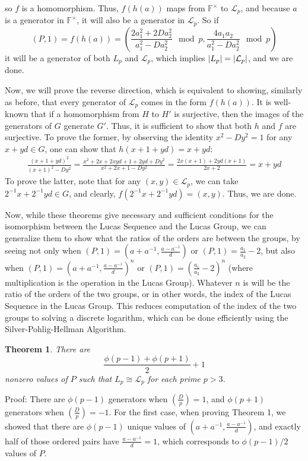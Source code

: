 \documentclass{article}
\DeclarePairedDelimiter{\abs}{\lvert}{\rvert}
\newcommand{\legendre}[2]{\genfrac{(}{)}{}{}{#1}{#2}}
\newtheorem{theorem}{Theorem}
\begin{document}
so $f$ is a homomorphism. Thus, $f(h(a))$ maps from $\mathbb{F}^\times$ to $\mathcal{L}_p$, and because $a$ is a generator in $\mathbb{F}^\times$, it will also be a generator in $\mathcal{L}_p$. So if $$(P,1) = f(h(a)) = \left ( \frac{2a_1^2 + 2Da_2^2}{a_1^2-Da_2^2} \mod p, \frac{4a_1a_2}{a_1^2-Da_2^2} \mod p \right )$$ it will be a generator of both $L_p$ and $\mathcal{L}_p$, which implies $\abs{L_p} = \abs{\mathcal{L}_p}$, and we are done.

Now, we will prove the reverse direction, which is equivalent to showing, similarly as before, that every generator of $\mathcal{L}_p$ comes in the form $f(h(a))$. It is well-known that if a homomorphism from $H$ to $H'$ is surjective, then the images of the generators of $G$ generate $G'$. Thus, it is sufficient to show that both $h$ and $f$ are surjective. To prove the former, by observing the identity $x^2-Dy^2 = 1$ for any $x+yd \in G$, one can show that $h(x+1+yd) = x+yd$:
\begin{gather*}
	\frac{(x+1+yd)^2}{(x+1)^2-Dy^2} = \frac{x^2 + 2x + 2xyd + 1 + 2yd + Dy^2}{x^2 + 2x + 1 - Dy^2} = \frac{2x(x+1) + 2yd(x+1)}{2x + 2} = x + yd
\end{gather*}
To prove the latter, note that for any $(x,y) \in \mathcal{L}_p$, we can take $2^{-1}x + 2^{-1}yd \in G$, and clearly, $f(2^{-1}x + 2^{-1}yd) = (x,y)$. Thus, we are done.

Now, while these theorems give necessary and sufficient conditions for the isomorphism between the Lucas Sequence and the Lucas Group, we can generalize them to show what the ratios of the orders are between the groups, by seeing not only when $(P,1) = (a+a^{-1}, \frac{a-a^{-1}}{d})$ or $(P,1) = \frac{a_1}{a_2} - 2$, but also when $(P,1) = (a+a^{-1}, \frac{a-a^{-1}}{d})^n$ or $(P,1) = (\frac{a_1}{a_2} - 2)^n$ (where multiplication is the operation in the Lucas Group). Whatever $n$ is will be the ratio of the orders of the two groups, or in other words, the index of the Lucas Sequence in the Lucas Group. This reduces computation of the index of the two groups to solving a discrete logarithm, which can be done efficiently using the Silver-Pohlig-Hellman Algorithm. 

\begin{theorem}
There are $$\frac{\phi(p-1) + \phi(p+1)}{2} + 1$$ nonzero values of $P$ such that $L_p \cong \mathcal{L}_p$ for each prime $p > 3$. 
\end{theorem}

Proof: There are $\phi(p-1)$ generators when $\legendre{D}{p} = 1$, and $\phi(p+1)$ generators when $\legendre{D}{p} = -1$. For the first case, when proving Theorem 1, we showed that there are $\phi(p-1)$ unique values of $(a+a^{-1}, \frac{a-a^{-1}}{d})$, and exactly half of those ordered pairs have $\frac{a-a^{-1}}{d}=1$, which corresponds to $\phi(p-1)/2$ values of $P$. 
\end{document}
